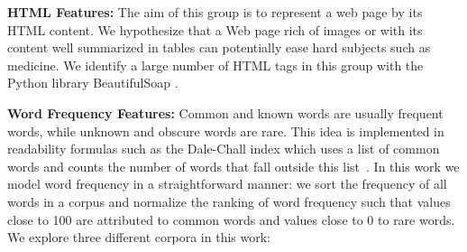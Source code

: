 \textbf{HTML Features:}
The aim of this group is to represent a web page by its HTML content.
We hypothesize that a Web page rich of images or with its content well summarized in tables can potentially ease hard subjects such as medicine. 
We identify a large number of HTML tags in this group with the Python library BeautifulSoap \cite{bs4}.

\textbf{Word Frequency Features:}
Common and known words are usually frequent words, while unknown and obscure words are rare. This idea is implemented in readability formulas such as the Dale-Chall index which uses a list of common words and counts the number of words that fall outside this list~\cite{dale48}.
In this work we model word frequency in a straightforward manner: we sort the frequency of all words in a corpus and normalize the ranking of word frequency such that values close to 100 are attributed to common words and values close to 0 to rare words. 
We explore three different corpora in this work:

